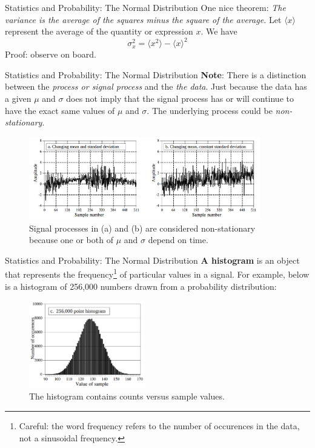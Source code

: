 \documentclass{beamer}
\begin{document}
\begin{frame}[fragile]{Statistics and Probability: The Normal Distribution}
One nice theorem: \textit{The variance is the average of the squares minus the square of the average.}  Let $\langle x \rangle$ represent the average of the quantity or expression $x$.  We have
\begin{equation}
\sigma_x^2 = \langle x^2 \rangle - \langle x \rangle^2
\end{equation}
Proof: observe on board.
\end{frame}

\begin{frame}[fragile]{Statistics and Probability: The Normal Distribution}
\small
\textbf{Note}: There is a distinction between the \textit{process or signal process} and the \textit{the data}.  Just because the data has a given $\mu$ and $\sigma$ does not imply that the signal process has or will continue to have the exact same values of $\mu$ and $\sigma$.  The underlying process could be \textit{non-stationary}.
\begin{figure}
\centering
\includegraphics[width=0.9\textwidth]{figures/non_stationary.png}
\caption{\label{fig:non_stationary2} Signal processes in (a) and (b) are considered \alert{non-stationary} because one or both of $\mu$ and $\sigma$ depend on time.}
\end{figure}
\end{frame}

\begin{frame}[fragile]{Statistics and Probability: The Normal Distribution}
\small
\textbf{A histogram} is an object that represents the frequency\footnote{Careful: the word frequency refers to the number of occurences in the data, not a sinusoidal frequency.} of particular values in a signal.  For example, below is a histogram of 256,000 numbers drawn from a probability distribution:
\begin{figure}
\centering
\includegraphics[width=0.45\textwidth]{figures/hist.png}
\caption{\label{fig:hist} The histogram contains counts versus sample values.}
\end{figure}
\end{frame}
\end{document}
